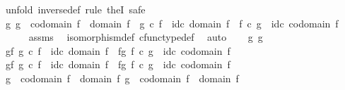 \begin{isabellebody}
%
\isadelimproof
%
\endisadelimproof
%
\isatagproof
{}\isamarkupfalse%
\ {\isacharparenleft}{\kern0pt}unfold\ inverse{\isacharunderscore}{\kern0pt}def{\isacharcomma}{\kern0pt}\ rule\ theI{\isacharprime}{\kern0pt}{\isacharcomma}{\kern0pt}\ safe{\isacharparenright}{\kern0pt}\isanewline
\ \ \isamarkupfalse%
\ {\isachardoublequoteopen}{\isasymexists}g{\isachardot}{\kern0pt}\ g\ {\isacharcolon}{\kern0pt}\ codomain\ f\ {\isasymrightarrow}\ domain\ f\ {\isasymand}\ g\ {\isasymcirc}\isactrlsub c\ f\ {\isacharequal}{\kern0pt}\ id\isactrlsub c\ {\isacharparenleft}{\kern0pt}domain\ f{\isacharparenright}{\kern0pt}\ {\isasymand}\ f\ {\isasymcirc}\isactrlsub c\ g\ {\isacharequal}{\kern0pt}\ id\isactrlsub c\ {\isacharparenleft}{\kern0pt}codomain\ f{\isacharparenright}{\kern0pt}{\isachardoublequoteclose}\isanewline
\ \ \ \ \isamarkupfalse%
\ assms\ \isamarkupfalse%
\ isomorphism{\isacharunderscore}{\kern0pt}def\ cfunc{\isacharunderscore}{\kern0pt}type{\isacharunderscore}{\kern0pt}def\ \isamarkupfalse%
\ auto\isanewline
{}\isamarkupfalse%
\isanewline
\ \ \isamarkupfalse%
\ g{}\ g{}\isanewline
\ \ \isamarkupfalse%
\ g{}{\isacharunderscore}{\kern0pt}f{\isacharcolon}{\kern0pt}\ {\isachardoublequoteopen}g{}\ {\isasymcirc}\isactrlsub c\ f\ {\isacharequal}{\kern0pt}\ id\isactrlsub c\ {\isacharparenleft}{\kern0pt}domain\ f{\isacharparenright}{\kern0pt}{\isachardoublequoteclose}\ \ f{\isacharunderscore}{\kern0pt}g{}{\isacharcolon}{\kern0pt}\ {\isachardoublequoteopen}f\ {\isasymcirc}\isactrlsub c\ g{}\ {\isacharequal}{\kern0pt}\ id\isactrlsub c\ {\isacharparenleft}{\kern0pt}codomain\ f{\isacharparenright}{\kern0pt}{\isachardoublequoteclose}\isanewline
\ \ \isamarkupfalse%
\ g{}{\isacharunderscore}{\kern0pt}f{\isacharcolon}{\kern0pt}\ {\isachardoublequoteopen}g{}\ {\isasymcirc}\isactrlsub c\ f\ {\isacharequal}{\kern0pt}\ id\isactrlsub c\ {\isacharparenleft}{\kern0pt}domain\ f{\isacharparenright}{\kern0pt}{\isachardoublequoteclose}\ \ f{\isacharunderscore}{\kern0pt}g{}{\isacharcolon}{\kern0pt}\ {\isachardoublequoteopen}f\ {\isasymcirc}\isactrlsub c\ g{}\ {\isacharequal}{\kern0pt}\ id\isactrlsub c\ {\isacharparenleft}{\kern0pt}codomain\ f{\isacharparenright}{\kern0pt}{\isachardoublequoteclose}\isanewline
\ \ \isamarkupfalse%
\ {\isachardoublequoteopen}g{}\ {\isacharcolon}{\kern0pt}\ codomain\ f\ {\isasymrightarrow}\ domain\ f{\isachardoublequoteclose}\ {\isachardoublequoteopen}g{}\ {\isacharcolon}{\kern0pt}\ codomain\ f\ {\isasymrightarrow}\ domain\ f{\isachardoublequoteclose}\isanewline

\end{isabellebody}
